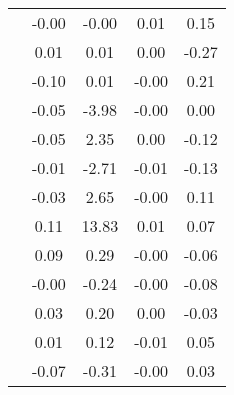 \begin{table}
\begin{tabular}{c|cc|cc|}
\multicolumn{1}{|c|}{} & \multicolumn{1}{|c|}{     -0.00} & \multicolumn{1}{|c|}{     -0.00} & \multicolumn{1}{|c|}{      0.01} & \multicolumn{1}{|c|}{      0.15} \\ 
\multicolumn{1}{|c|}{} & \multicolumn{1}{|c|}{      0.01} & \multicolumn{1}{|c|}{      0.01} & \multicolumn{1}{|c|}{      0.00} & \multicolumn{1}{|c|}{     -0.27} \\ 
\multicolumn{1}{|c|}{} & \multicolumn{1}{|c|}{     -0.10} & \multicolumn{1}{|c|}{      0.01} & \multicolumn{1}{|c|}{     -0.00} & \multicolumn{1}{|c|}{      0.21} \\ 
\multicolumn{1}{|c|}{} & \multicolumn{1}{|c|}{     -0.05} & \multicolumn{1}{|c|}{     -3.98} & \multicolumn{1}{|c|}{     -0.00} & \multicolumn{1}{|c|}{      0.00} \\ 
\multicolumn{1}{|c|}{} & \multicolumn{1}{|c|}{     -0.05} & \multicolumn{1}{|c|}{      2.35} & \multicolumn{1}{|c|}{      0.00} & \multicolumn{1}{|c|}{     -0.12} \\ 
\multicolumn{1}{|c|}{} & \multicolumn{1}{|c|}{     -0.01} & \multicolumn{1}{|c|}{     -2.71} & \multicolumn{1}{|c|}{     -0.01} & \multicolumn{1}{|c|}{     -0.13} \\ 
\multicolumn{1}{|c|}{} & \multicolumn{1}{|c|}{     -0.03} & \multicolumn{1}{|c|}{      2.65} & \multicolumn{1}{|c|}{     -0.00} & \multicolumn{1}{|c|}{      0.11} \\ 
\multicolumn{1}{|c|}{} & \multicolumn{1}{|c|}{      0.11} & \multicolumn{1}{|c|}{     13.83} & \multicolumn{1}{|c|}{      0.01} & \multicolumn{1}{|c|}{      0.07} \\ 
\multicolumn{1}{|c|}{} & \multicolumn{1}{|c|}{      0.09} & \multicolumn{1}{|c|}{      0.29} & \multicolumn{1}{|c|}{     -0.00} & \multicolumn{1}{|c|}{     -0.06} \\ 
\multicolumn{1}{|c|}{} & \multicolumn{1}{|c|}{     -0.00} & \multicolumn{1}{|c|}{     -0.24} & \multicolumn{1}{|c|}{     -0.00} & \multicolumn{1}{|c|}{     -0.08} \\ 
\multicolumn{1}{|c|}{} & \multicolumn{1}{|c|}{      0.03} & \multicolumn{1}{|c|}{      0.20} & \multicolumn{1}{|c|}{      0.00} & \multicolumn{1}{|c|}{     -0.03} \\ 
\multicolumn{1}{|c|}{} & \multicolumn{1}{|c|}{      0.01} & \multicolumn{1}{|c|}{      0.12} & \multicolumn{1}{|c|}{     -0.01} & \multicolumn{1}{|c|}{      0.05} \\ 
\multicolumn{1}{|c|}{} & \multicolumn{1}{|c|}{     -0.07} & \multicolumn{1}{|c|}{     -0.31} & \multicolumn{1}{|c|}{     -0.00} & \multicolumn{1}{|c|}{      0.03} \\ 

\end{tabular}
\end{table}
